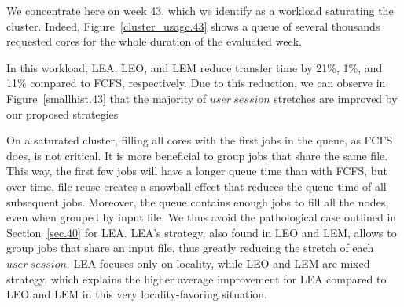 \documentclass[conference]{IEEEtran}
\newcommand{\us}{\ensuremath{\mathit{user~session}}\xspace}
\begin{document}
We concentrate here on week 43, which we identify as a workload saturating the cluster.
Indeed, Figure~\ref{cluster_usage.43} shows 
a queue of several thousands requested cores
for the whole duration of the evaluated week.


In this workload, LEA, LEO, and LEM reduce transfer time by 21\%, 1\%, and 11\% compared to FCFS, respectively.
Due to this reduction, we can observe in Figure~\ref{smallhist.43} that the majority of \us stretches are improved by our proposed strategies

On a saturated cluster, filling all cores with the first jobs in the queue, as FCFS does, is not critical.
It is more beneficial to group jobs that share the same file.
This way, the first few jobs will have a longer queue time than with FCFS, but over time, file reuse creates a snowball effect that reduces the queue time of all subsequent jobs.
Moreover, the queue contains enough jobs to fill all the nodes, even when grouped by input file.
We thus avoid the pathological case outlined in Section~\ref{sec.40} for LEA.
LEA's strategy, also found in LEO and LEM, allows to group jobs that share an input file, thus greatly reducing the stretch of each \us.
LEA focuses only on locality, while LEO and LEM are mixed strategy, which explains the higher average improvement for LEA compared to LEO and LEM in this very locality-favoring situation.
\end{document}
